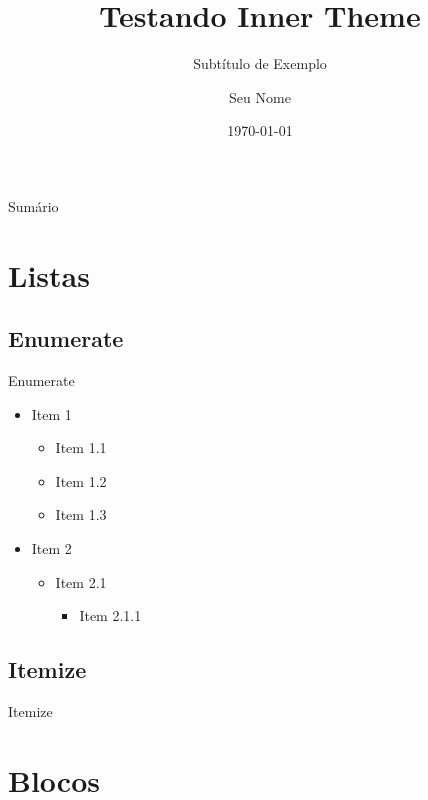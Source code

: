 \documentclass[aspectratio = 169]{beamer}
\title{Testando Inner Theme}
\subtitle{Subtítulo de Exemplo}
\author{Seu Nome}
\institute{Sua Instituição}
\date{\today}
\begin{document}
\maketitle %

\begin{frame}{Sumário}

\tableofcontents
    
\end{frame}

\section{Listas}

\subsection{Enumerate}

\begin{frame}{Enumerate}

\begin{itemize}
    \item Item 1
    \begin{itemize}
        \item Item 1.1
        \item Item 1.2
        \item Item 1.3
    \end{itemize}
    \item Item 2
    \begin{itemize}
        \item Item 2.1
        \begin{itemize}
            \item Item 2.1.1
        \end{itemize}
    \end{itemize}
\end{itemize}
    
\end{frame}

\subsection{Itemize}

\begin{frame}{Itemize}
    
\end{frame}

\section{Blocos}
\end{document}
